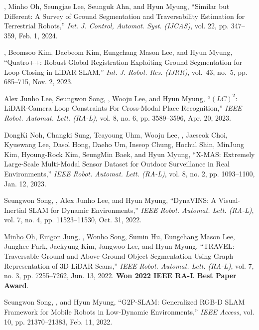 \begin{pubSubsectionNum}
    \item {{\hyungtaelim}, Minho Oh, Seungjae Lee, Seunguk Ahn, and Hyun Myung, ``Similar but Different: A Survey of Ground Segmentation and Traversability Estimation for Terrestrial Robots,'' \textit{Int. J. Control, Automat. Syst. (IJCAS)}, vol. 22, pp. 347--359, Feb. 1, 2024}.
    \item {{\hyungtaelim}, Beomsoo Kim, Daebeom Kim, Eungchang Mason Lee, and Hyun Myung, ``Quatro++: Robust Global Registration Exploiting Ground Segmentation for Loop Closing in LiDAR SLAM,'' \textit{Int. J. Robot. Res. (IJRR)}, vol.~43, no.~5, pp. 685--715, Nov. 2, 2023}.
    \item Alex Junho Lee, Seungwon Song, \hyungtaelim, Wooju Lee, and Hyun Myung, ``$(LC)^2$: LiDAR-Camera Loop Constraints For Cross-Modal Place Recognition,'' \textit{IEEE Robot. Automat. Lett. (RA-L)}, vol. 8, no. 6, pp. 3589--3596, Apr. 20, 2023.
    \item DongKi Noh, Changki Sung, Teayoung Uhm, Wooju Lee, \hyungtaelim, Jaeseok Choi, Kyuewang Lee, Dasol Hong, Daeho Um, Inseop Chung, Hochul Shin, MinJung Kim, Hyoung-Rock Kim, SeungMin Baek, and Hyun Myung, ``X-MAS: Extremely Large-Scale Multi-Modal Sensor Dataset for Outdoor Surveillance in Real Environments,'' \textit{IEEE Robot. Automat. Lett. (RA-L)}, vol. 8, no. 2, pp. 1093--1100, Jan. 12, 2023.
    \item Seungwon Song, \hyungtaelim, Alex Junho Lee, and Hyun Myung, ``DynaVINS: A Visual-Inertial SLAM for Dynamic Environments,'' \textit{IEEE Robot. Automat. Lett. (RA-L)}, vol. 7, no. 4, pp. 11523--11530, Oct. 31, 2022.
    \item \underline{Minho Oh}, \underline{Euigon Jung}, \hyungtaelim, Wonho Song, Sumin Hu, Eungchang Mason Lee, Junghee Park, Jaekyung Kim, Jangwoo Lee, and Hyun Myung, ``TRAVEL: Traversable Ground and Above-Ground Object Segmentation Using Graph Representation of 3D LiDAR Scans,'' \textit{IEEE Robot. Automat. Lett. (RA-L)}, vol. 7, no. 3, pp. 7255--7262, Jun. 13, 2022. \textbf{Won 2022 IEEE RA-L Best Paper Award}.
    \item Seungwon Song, \hyungtaelim, and Hyun Myung, ``G2P-SLAM: Generalized RGB-D SLAM Framework for Mobile Robots in Low-Dynamic Environments,'' \textit{IEEE Access}, vol. 10, pp. 21370--21383, Feb. 11, 2022.

\end{pubSubsectionNum}
